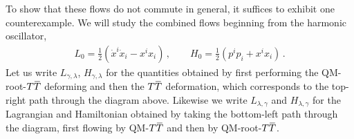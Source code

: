 \documentclass[12pt]{article}
\numberwithin{equation}{section}
\newcommand{\overbar}[1]{\mkern 1.5mu\overline{\mkern-1.5mu#1\mkern-1.5mu}\mkern 1.5mu}
\def\TT{{T\overbar{T}}}
\begin{document}
To show that these flows do not commute in general, it suffices to exhibit one counterexample. We will study the combined flows beginning from the harmonic oscillator,
%
\begin{align}
    L_0 = \frac{1}{2} \left( \dot{x}^i \dot{x}_i - x^i x_i \right) \, , \qquad H_0 = \frac{1}{2} \left( p^i p_i + x^i x_i \right) \, .
\end{align}
%
Let us write $L_{\gamma, \lambda}$, $H_{\gamma, \lambda}$ for the quantities obtained by first performing the QM-root-$\TT$ deforming and then the $\TT$ deformation, which corresponds to the top-right path through the diagram above. Likewise we write $L_{\lambda, \gamma}$ and $H_{\lambda, \gamma}$ for the Lagrangian and Hamiltonian obtained by taking the bottom-left path through the diagram, first flowing by QM-$\TT$ and then by QM-root-$\TT$.
\end{document}
